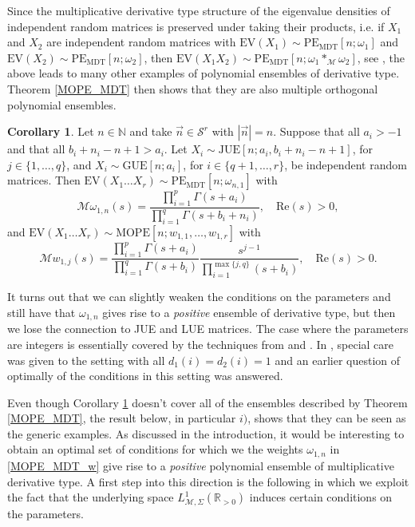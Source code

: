 \documentclass[a4paper,12pt,oneside]{article}
\theoremstyle{definition}
\newtheorem{cor}[defi]{Corollary}
\newcommand{\N}{\mathbb{N}}
\newcommand{\R}{\mathbb{R}}
\newcommand{\om}{\omega}
\newcommand{\sz}[1]{\left| \vec{#1} \right|}
\newcommand{\MT}[1]{\mathcal{M}#1}
\begin{document}
Since the multiplicative derivative type structure of the eigenvalue densities of independent random matrices is preserved under taking their products, i.e. if $X_1$ and $X_2$ are independent random matrices with $\text{EV}(X_1)\sim\text{PE}_{\text{MDT}}[n;\om_1]$ and $\text{EV}(X_2)\sim\text{PE}_{\text{MDT}}[n;\om_2]$, then $\text{EV}(X_1X_2)\sim\text{PE}_{\text{MDT}}[n;\om_1\ast_{\MT{}}\om_2]$, see \cite{FKK:PolyaE}, the above leads to many other examples of polynomial ensembles of derivative type. Theorem \ref{MOPE_MDT} then shows that they are also multiple orthogonal polynomial ensembles.

\begin{cor} \label{MOPE_MDT_EX}
     Let $n\in\N$ and take $\vec{n}\in\mathcal{S}^r$ with $\sz{n}=n$. Suppose that all $a_i>-1$ and that all $b_i+n_i-n+1>a_i$. Let $ X_i\sim\text{JUE}[n;a_i,b_i+n_i-n+1]$, for $j\in\{1,\dots,q\}$, and $ X_i\sim\text{GUE}[n;a_i]$, for $i\in\{q+1,\dots,r\}$, be independent random matrices. Then $\text{EV}(X_1\dots X_r)\sim\text{PE}_{\text{MDT}}[n;\om_{n,1}]$
    with 
        $$ \MT{\om_{1,n}}(s) =  \frac{\prod_{i=1}^p \Gamma(s+a_i)}{\prod_{i=1}^q \Gamma(s+b_i+n_i)},\quad \text{Re}(s)>0, $$
    and $\text{EV}(X_1\dots X_r)\sim\text{MOPE}[n;w_{1,1},\dots,w_{1,r}]$ with
        $$ \MT{w_{1,j}}(s) = \frac{\prod_{i=1}^p \Gamma(s+a_i)}{\prod_{i=1}^q \Gamma(s+b_i)} \frac{s^{j-1}}{\prod_{i=1}^{\max\{j,q\}} (s+b_i)},\quad \text{Re}(s)>0.$$
\end{cor}

It turns out that we can slightly weaken the conditions on the parameters and still have that $\om_{1,n}$ gives rise to a \textit{positive} ensemble of derivative type, but then we lose the connection to JUE and LUE matrices. The case where the parameters are integers is essentially covered by the techniques from \cite[Cor. 2.4]{KKS:trunc_prod} and \cite[Thm. 2.1]{KS:gin_prod}. In \cite[Thm. 2.19]{CKW:sums_prod}, special care was given to the setting with all $d_1(i)=d_2(i)=1$ and an earlier question of optimally of the conditions in this setting was answered.
\medbreak

Even though Corollary \ref{MOPE_MDT_EX} doesn't cover all of the ensembles described by Theorem \ref{MOPE_MDT}, the result below, in particular $i)$, shows that they can be seen as the generic examples. As discussed in the introduction, it would be interesting to obtain an optimal set of conditions for which we the weights $\om_{1,n}$ in \eqref{MOPE_MDT_w} give rise to a \textit{positive} polynomial ensemble of multiplicative derivative type. A first step into this direction is the following in which we exploit the fact that the underlying space $L_{\MT{},\Sigma}^1(\R_{>0})$ induces certain conditions on the parameters.
\end{document}
